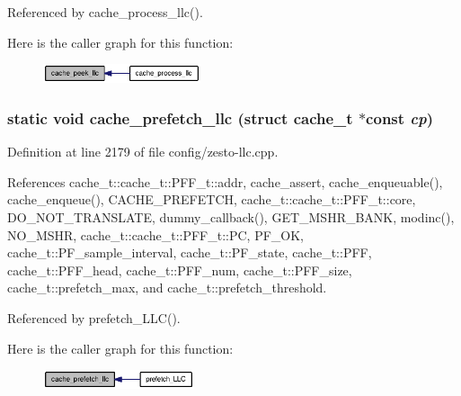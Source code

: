 Referenced by cache\_\-process\_\-llc().

Here is the caller graph for this function:\nopagebreak
\begin{figure}[H]
\begin{center}
\leavevmode
\includegraphics[width=131pt]{config_2zesto-llc_8cpp_955da6a438bbb3f390d758f2f75fa822_icgraph}
\end{center}
\end{figure}
\subsubsection[{cache\_\-prefetch\_\-llc}]{\setlength{\rightskip}{0pt plus 5cm}static void cache\_\-prefetch\_\-llc (struct {\bf cache\_\-t} $\ast$const  {\em cp})\hspace{0.3cm}{\tt  [static]}}\label{config_2zesto-llc_8cpp_0bb0f060c77b60c70dce0eee1abb237a}




Definition at line 2179 of file config/zesto-llc.cpp.

References cache\_\-t::cache\_\-t::PFF\_\-t::addr, cache\_\-assert, cache\_\-enqueuable(), cache\_\-enqueue(), CACHE\_\-PREFETCH, cache\_\-t::cache\_\-t::PFF\_\-t::core, DO\_\-NOT\_\-TRANSLATE, dummy\_\-callback(), GET\_\-MSHR\_\-BANK, modinc(), NO\_\-MSHR, cache\_\-t::cache\_\-t::PFF\_\-t::PC, PF\_\-OK, cache\_\-t::PF\_\-sample\_\-interval, cache\_\-t::PF\_\-state, cache\_\-t::PFF, cache\_\-t::PFF\_\-head, cache\_\-t::PFF\_\-num, cache\_\-t::PFF\_\-size, cache\_\-t::prefetch\_\-max, and cache\_\-t::prefetch\_\-threshold.

Referenced by prefetch\_\-LLC().

Here is the caller graph for this function:\nopagebreak
\begin{figure}[H]
\begin{center}
\leavevmode
\includegraphics[width=126pt]{config_2zesto-llc_8cpp_0bb0f060c77b60c70dce0eee1abb237a_icgraph}
\end{center}
\end{figure}

